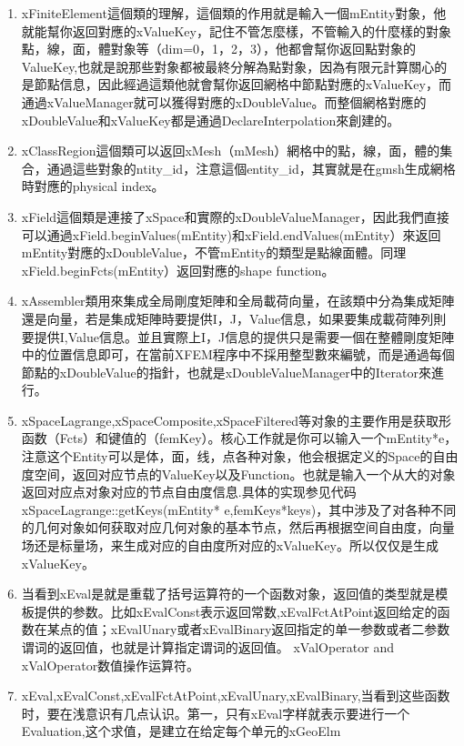\documentclass{article}
\begin{document}
\begin{enumerate}
\item xFiniteElement這個類的理解，這個類的作用就是輸入一個mEntity對象，他就能幫你返回對應的xValueKey，記住不管怎麼樣，不管輸入的什麼樣的對象點，線，面，體對象等（dim=0，1，2，3），他都會幫你返回點對象的ValueKey,也就是說那些對象都被最終分解為點對象，因為有限元計算關心的是節點信息，因此經過這類他就會幫你返回網格中節點對應的xValueKey，而通過xValueManager就可以獲得對應的xDoubleValue。而整個網格對應的xDoubleValue和xValueKey都是通過DeclareInterpolation來創建的。
\item xClassRegion這個類可以返回xMesh（mMesh）網格中的點，線，面，體的集合，通過這些對象的ntity\_id，注意這個entity\_id，其實就是在gmsh生成網格時對應的physical
index。
\item xField這個類是連接了xSpace和實際的xDoubleValueManager，因此我們直接可以通過xField.beginValues(mEntity)和xField.endValues(mEntity）來返回mEntity對應的xDoubleValue，不管mEntity的類型是點線面體。同理xField.beginFcts(mEntity）返回對應的shape
function。
\item xAssembler類用來集成全局剛度矩陣和全局載荷向量，在該類中分為集成矩陣還是向量，若是集成矩陣時要提供I，J，Value信息，如果要集成載荷陣列則要提供I,Value信息。並且實際上I，J信息的提供只是需要一個在整體剛度矩陣中的位置信息即可，在當前XFEM程序中不採用整型數來編號，而是通過每個節點的xDoubleValue的指針，也就是xDoubleValueManager中的Iterator來進行。
\item xSpaceLagrange,xSpaceComposite,xSpaceFiltered等对象的主要作用是获取形函数（Fcts）和键值的（femKey）。核心工作就是你可以输入一个mEntity{*}e，注意这个Entity可以是体，面，线，点各种对象，他会根据定义的Space的自由度空间，返回对应节点的ValueKey以及Function。也就是输入一个从大的对象返回对应点对象对应的节点自由度信息.具体的实现参见代码xSpaceLagrange::getKeys(mEntity{*}
e,femKeys{*}keys)，其中涉及了对各种不同的几何对象如何获取对应几何对象的基本节点，然后再根据空间自由度，向量场还是标量场，来生成对应的自由度所对应的xValueKey。所以仅仅是生成xValueKey。 
\item 当看到xEval是就是重载了括号运算符的一个函数对象，返回值的类型就是模板提供的参数。比如xEvalConst表示返回常数,xEvalFctAtPoint返回给定的函数在某点的值；xEvalUnary或者xEvalBinary返回指定的单一参数或者二参数谓词的返回值，也就是计算指定谓词的返回值。
xValOperator and xValOperator数值操作运算符。 
\item xEval,xEvalConst,xEvalFctAtPoint,xEvalUnary,xEvalBinary,当看到这些函数时，要在浅意识有几点认识。第一，只有xEval字样就表示要进行一个Evaluation,这个求值，是建立在给定每个单元的xGeoElm

\end{enumerate}
\end{document}

